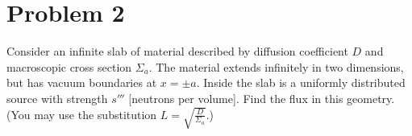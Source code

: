 \section*{Problem 2}

Consider an infinite slab of material described by diffusion coefficient $D$ and macroscopic cross section $\Sigma_a$. 
The material extends infinitely in two dimensions, but has vacuum boundaries at $x=\pm a$.
Inside the slab is a uniformly distributed source with strength $s'''$ [neutrons per volume]. 
Find the flux in this geometry. 
(You may use the substitution $L = \sqrt{\frac{D}{\Sigma_a}}$.)

